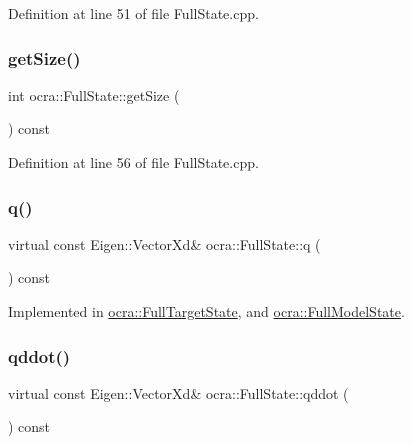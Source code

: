 Definition at line 51 of file Full\+State.\+cpp.

\hypertarget{classocra_1_1FullState_a64f03f9385b36840d23e06de18a40112}{}\label{classocra_1_1FullState_a64f03f9385b36840d23e06de18a40112} 
\subsubsection{\texorpdfstring{get\+Size()}{getSize()}}
{\footnotesize\ttfamily int ocra\+::\+Full\+State\+::get\+Size (\begin{DoxyParamCaption}{ }\end{DoxyParamCaption}) const}



Definition at line 56 of file Full\+State.\+cpp.

\hypertarget{classocra_1_1FullState_a3bb03b513d7cb3a5447d1d4eb2d643b0}{}\label{classocra_1_1FullState_a3bb03b513d7cb3a5447d1d4eb2d643b0} 
\subsubsection{\texorpdfstring{q()}{q()}}
{\footnotesize\ttfamily virtual const Eigen\+::\+Vector\+Xd\& ocra\+::\+Full\+State\+::q (\begin{DoxyParamCaption}{ }\end{DoxyParamCaption}) const\hspace{0.3cm}{\ttfamily [pure virtual]}}



Implemented in \hyperlink{classocra_1_1FullTargetState_a0f246232828d53c497924b95d2b97004}{ocra\+::\+Full\+Target\+State}, and \hyperlink{classocra_1_1FullModelState_a3a560064b1be8bd1579382aa08686904}{ocra\+::\+Full\+Model\+State}.

\hypertarget{classocra_1_1FullState_a5882a53273cd9d3baae36b5850deadae}{}\label{classocra_1_1FullState_a5882a53273cd9d3baae36b5850deadae} 
\subsubsection{\texorpdfstring{qddot()}{qddot()}}
{\footnotesize\ttfamily virtual const Eigen\+::\+Vector\+Xd\& ocra\+::\+Full\+State\+::qddot (\begin{DoxyParamCaption}{ }\end{DoxyParamCaption}) const\hspace{0.3cm}{\ttfamily [pure virtual]}}



